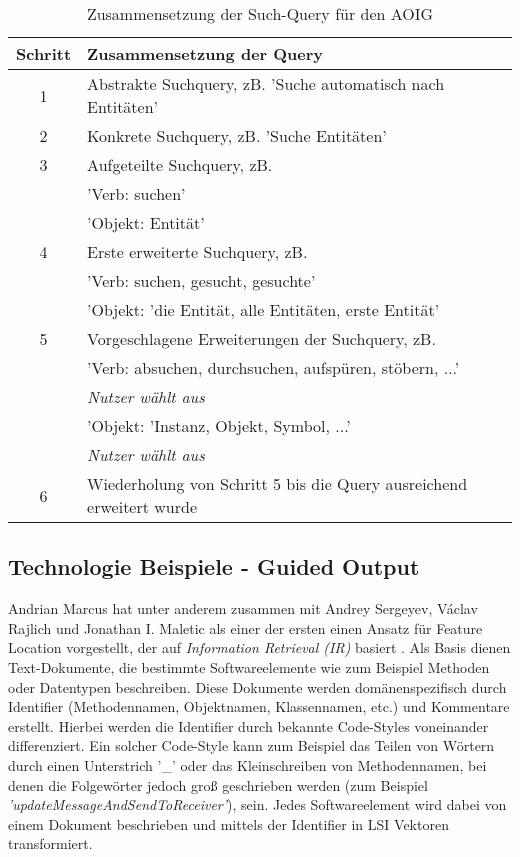 \documentclass[runningheads,a4paper]{llncs}
\begin{document}
\begin{table}[h]
	\centering
	\begin{tabular}{|c|l|}
		\hline
		\hspace{0.1cm} \textbf{Schritt} \hspace{0.1cm} & \textbf{Zusammensetzung der Query}\\
		\hline
		1 & Abstrakte Suchquery, zB. 'Suche automatisch nach Entitäten'\\
		\hline
		2 & Konkrete Suchquery, zB. 'Suche Entitäten'\\
		\hline
		3 & Aufgeteilte Suchquery, zB.\\
		& 'Verb: suchen'\\
		& 'Objekt: Entität'\\
		\hline
		4 & Erste erweiterte Suchquery, zB.\\
		& 'Verb: suchen, gesucht, gesuchte'\\
		& 'Objekt: 'die Entität, alle Entitäten, erste Entität'\\
		\hline
		5 & Vorgeschlagene Erweiterungen der Suchquery, zB.\\
		& 'Verb: absuchen, durchsuchen, aufspüren, stöbern, ...'\\
		& \textit{Nutzer wählt aus}\\
		& 'Objekt: 'Instanz, Objekt, Symbol, ...'\\
		& \textit{Nutzer wählt aus}\\
		\hline
		6 & Wiederholung von Schritt 5 bis die Query ausreichend erweitert wurde\\
		\hline
	\end{tabular}
	\label{query}
	\vspace{0.2cm}
	\caption{Zusammensetzung der Such-Query für den AOIG}
\end{table}

\subsection*{Technologie Beispiele - Guided Output}

Andrian Marcus hat unter anderem zusammen mit Andrey Sergeyev, Václav \mbox{Rajlich} und Jonathan I. Maletic als einer der ersten einen Ansatz für Feature Location vorgestellt, der auf \textit{Information Retrieval (IR)} basiert \cite{marcus1}\cite{marcus2}. Als Basis dienen Text-Dokumente, die bestimmte Softwareelemente wie zum Beispiel Methoden oder Datentypen beschreiben. Diese Dokumente werden domänenspezifisch durch Identifier (Methodennamen, Objektnamen, Klassennamen, etc.) und Kommentare erstellt. Hierbei werden die Identifier durch bekannte Code-Styles voneinander differenziert. Ein solcher Code-Style kann zum Beispiel das Teilen von Wörtern durch einen Unterstrich '\_' oder das Kleinschreiben von Methodennamen, bei denen die Folgewörter jedoch groß geschrieben werden (zum Beispiel \textit{'updateMessageAndSendToReceiver'}), sein. Jedes Softwareelement wird dabei von einem Dokument beschrieben und mittels der Identifier in LSI Vektoren transformiert.
\end{document}

